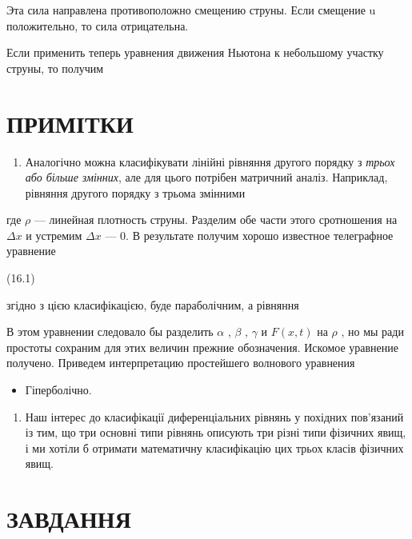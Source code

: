 \documentclass[
  ukrainian,
]{article}
\providecommand{\tightlist}{%
  \setlength{\itemsep}{0pt}\setlength{\parskip}{0pt}}
\begin{document}
Эта сила направлена противоположно смещению струны. Если смещение u
положительно, то сила отрицательна.

Если применить теперь уравнения движения Ньютона к небольшому участку
струны, то получим

\section{ПРИМІТКИ}\label{ux43fux440ux438ux43cux456ux442ux43aux438-2}

\begin{enumerate}
\def\labelenumi{\arabic{enumi}.}
\tightlist
\item
  Аналогічно можна класифікувати лінійні рівняння другого порядку з
  \emph{трьох або більше змінних}, але для цього потрібен матричний
  аналіз. Наприклад, рівняння другого порядку з трьома змінними
\end{enumerate}

где \(\rho\) --- линейная плотность струны. Разделим обе части этого
сротношения на \(\Delta x\) и устремим \(\Delta x\) --- 0. В результате
получим хорошо известное телеграфное уравнение

(16.1)

згідно з цією класифікацією, буде параболічним, а рівняння

В этом уравнении следовало бы разделить \(\alpha\) , \(\beta\) ,
\(\gamma\) и \(F(x,t)\) на \(\rho\) , но мы ради простоты сохраним для
этих величин прежние обозначения. Искомое уравнение получено. Приведем
интерпретацию простейшего волнового уравнения

\begin{itemize}
\tightlist
\item
  Гіперболічно.
\end{itemize}

\begin{enumerate}
\def\labelenumi{\arabic{enumi}.}
\setcounter{enumi}{1}
\tightlist
\item
  Наш інтерес до класифікації диференціальних рівнянь у похідних
  пов'язаний із тим, що три основні типи рівнянь описують три різні типи
  фізичних явищ, і ми хотіли б отримати математичну класифікацію цих
  трьох класів фізичних явищ.
\end{enumerate}

\section{ЗАВДАННЯ}\label{ux437ux430ux432ux434ux430ux43dux43dux44f-10}
\end{document}
